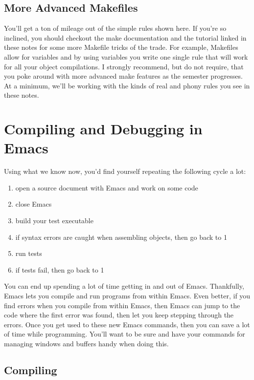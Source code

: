 \documentclass[]{tufte-handout}
\begin{document}
\subsection{More Advanced Makefiles}

You'll get a ton of mileage out of the simple rules shown here. If you're so inclined, you should checkout the make documentation and the tutorial linked in these notes for some more Makefile tricks of the trade. For example, Makefiles allow for variables and by using variables you write one single rule that will work for all your object compilations.  I strongly recommend, but do not require, that you poke around with more advanced make features as the semester progresses. At a minimum, we'll be working with the kinds of real and phony rules you see in these notes. 

\section{Compiling and Debugging in Emacs}

Using what we know now, you'd find yourself repeating the following cycle a lot: 
\begin{enumerate}
\item open a source document with Emacs and work on some code
\item close Emacs
\item build your test executable
\item if syntax errors are caught when assembling objects, then go back to 1
\item run tests
\item if tests fail, then go back to 1
\end{enumerate}
You can end up spending a lot of time getting in and out of Emacs. Thankfully, Emacs lets you compile and run programs from within Emacs. Even better, if you find errors when you compile from within Emacs, then Emacs can jump to the code where the first error was found, then let you keep stepping through the errors.  Once you get used to these new Emacs commands, then you can save a lot of time while programming. You'll want to be sure and have your commands for managing windows and buffers handy when doing this.

\subsection{Compiling}
\end{document}
